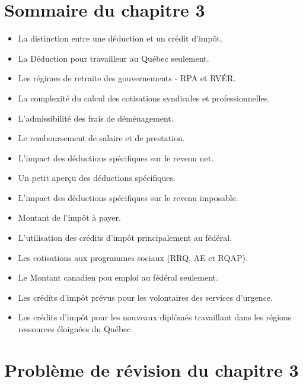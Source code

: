 \section{Sommaire du chapitre 3}
\begin{itemize}
	\item La distinction entre une déduction et un crédit d'impôt.
	\item La \og Déduction pour travailleur \fg{} au Québec seulement.
	\item Les régimes de retraite des gouvernements - RPA et RVÉR.
	\item La complexité du calcul des cotisations syndicales et professionnelles.
	\item L'admissibilité des frais de déménagement.
	\item Le remboursement de salaire et de prestation.
	\item L'impact des déductions spécifiques sur le revenu net.
	\item Un petit aperçu des déductions spécifiques.
	\item L'impact des déductions spécifiques sur le revenu imposable.
	\item Montant de l'impôt à payer.
	\item L'utilisation des crédits d'impôt principalement au fédéral.
	\item Les cotisations aux programmes sociaux (RRQ, AE et RQAP).
	\item Le \og Montant canadien pou emploi \fg{} au fédéral seulement.
	\item Les crédits d'impôt prévus pour les volontaires des services d'urgence.
	\item Les crédits d'impôt pour les nouveaux diplômés travaillant dans les régions ressources éloignées du Québec.
\end{itemize}



\section{Problème de révision du chapitre 3}
